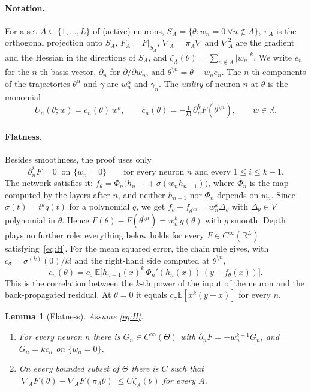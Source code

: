 \documentclass[11pt]{article}
\newtheorem{lemma}{Lemma}
\theoremstyle{definition}
\theoremstyle{remark}
\newcommand{\R}{\mathbb{R}}
\newcommand{\E}{\mathbb{E}}
\newcommand{\sm}{\setminus}
\begin{document}
\paragraph{Notation.} For a set $A\subseteq\{1,\dots,L\}$ of (active) neurons, $S_A=\{\theta:w_n=0\ \forall n\notin A\}$, $\pi_A$ is the orthogonal projection onto $S_A$, $F_A=F|_{S_A}$, $\nabla_A=\pi_A\nabla$ and $\nabla_A^2$ are the gradient and the Hessian in the directions of $S_A$, and $\zeta_A(\theta)=\sum_{n\notin A}|w_n|^k$. We write $e_n$ for the $n$-th basis vector, $\partial_n$ for $\partial/\partial w_n$, and $\theta^{\sm n}=\theta-w_ne_n$. The $n$-th components of the trajectories $\theta^\alpha$ and $\gamma$ are $w^\alpha_n$ and $\gamma_n$. The \emph{utility} of neuron $n$ at $\theta$ is the monomial
\[
U_n(\theta;w)=c_n(\theta)\,w^k,\qquad c_n(\theta)=-\tfrac1{k!}\,\partial_n^kF(\theta^{\sm n}),\qquad w\in\R .
\]

\paragraph{Flatness.} Besides smoothness, the proof uses only
\begingroup\renewcommand{\theHequation}{H}%
\begin{equation}\tag{H}\label{eq:H}
\partial_n^iF=0\ \text{ on }\{w_n=0\}\qquad\text{for every neuron $n$ and every $1\le i\le k-1$.}
\end{equation}
\endgroup
The network satisfies it: $f_\theta=\Phi_n\big(h_{n-1}+\sigma(w_nh_{n-1})\big)$, where $\Phi_n$ is the map computed by the layers after $n$, and neither $h_{n-1}$ nor $\Phi_n$ depends on $w_n$. Since $\sigma(t)=t^kq(t)$ for a polynomial $q$, we get $f_\theta-f_{\theta^{\sm n}}=w_n^k\Delta_\theta$ with $\Delta_\theta\in V$ polynomial in $\theta$. Hence $F(\theta)-F(\theta^{\sm n})=w_n^k\,g(\theta)$ with $g$ smooth. Depth plays no further role: everything below holds for every $F\in C^\infty(\R^L)$ satisfying~\eqref{eq:H}. For the mean squared error, the chain rule gives, with $c_\sigma=\sigma^{(k)}(0)/k!$ and the right-hand side computed at $\theta^{\sm n}$,
\[
c_n(\theta)=c_\sigma\,\E\big[h_{n-1}(x)^k\,\Phi_n'(h_n(x))\,(y-f_\theta(x))\big].
\]
This is the correlation between the $k$-th power of the input of the neuron and the back-propagated residual. At $\theta=0$ it equals $c_\sigma\E[x^k(y-x)]$ for every $n$.

\begin{lemma}[Flatness]\label{lem:flat}
Assume \eqref{eq:H}.
\begin{enumerate}[label=\textup{(\alph*)},nosep]
\item For every neuron $n$ there is $G_n\in C^\infty(\Theta)$ with $\partial_nF=-w_n^{k-1}G_n$, and $G_n=kc_n$ on $\{w_n=0\}$.
\item On every bounded subset of $\Theta$ there is $C$ such that $|\nabla_AF(\theta)-\nabla_AF(\pi_A\theta)|\le C\zeta_A(\theta)$ for every $A$.
\end{enumerate}
\end{lemma}
\end{document}

